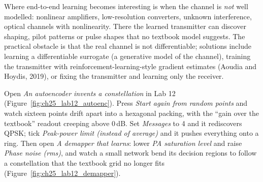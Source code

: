 
Where end-to-end learning becomes interesting is when the channel is \emph{not} well modelled:
nonlinear amplifiers, low-resolution converters, unknown interference, optical channels with
nonlinearity. There the learned transmitter can discover shaping, pilot patterns or pulse shapes that
no textbook model suggests. The practical obstacle is that the real channel is not differentiable;
solutions include learning a differentiable surrogate (a generative model of the channel), training
the transmitter with reinforcement-learning-style gradient estimates (Aoudia and Hoydis, 2019), or
fixing the transmitter and learning only the receiver.


\begin{tryit}
Open \emph{An autoencoder invents a constellation} in Lab 12 (Figure~\ref{fig:ch25_lab12_autoenc}).
Press \emph{Start again from random points} and watch sixteen points drift apart into a hexagonal
packing, with the ``gain over the textbook'' readout creeping above 0\,dB. Set \emph{Messages} to 4 and
it rediscovers QPSK; tick \emph{Peak-power limit (instead of average)} and it pushes everything onto a
ring. Then open \emph{A demapper that learns}: lower \emph{PA saturation level} and raise \emph{Phase
noise (rms)}, and watch a small network bend its decision regions to follow a constellation that the
textbook grid no longer fits (Figure~\ref{fig:ch25_lab12_demapper}).
\end{tryit}


